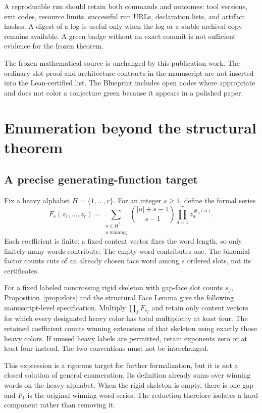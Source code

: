 \documentclass[11pt,reqno]{amsart}
\theoremstyle{definition}
\newcommand{\card}[1]{\lvert #1\rvert}
\begin{document}
A reproducible run should retain both commands and outcomes: tool versions,
exit codes, resource limits, successful run URLs, declaration lists, and
artifact hashes. A digest of a log is useful only when the log or a stable
archival copy remains available. A green badge without an exact commit is
not sufficient evidence for the frozen theorem.

The frozen mathematical source is unchanged by this publication work.
The ordinary slot proof and architecture contracts in the manuscript are not
inserted into the Lean-certified list. The Blueprint includes open nodes
where appropriate and does not color a conjecture green because it appears
in a polished paper.

\section{Enumeration beyond the structural theorem}\label{sec:enumeration}
\subsection{A precise generating-function target}
Fix a heavy alphabet $H=\{1,\ldots,r\}$. For an integer $s\geq1$, define the
formal series
\[
 F_s(z_1,\ldots,z_r)=
 \sum_{\substack{u\in H^*\\u\text{ winning}}}
 \binom{\card{u}+s-1}{s-1}
 \prod_{a=1}^r z_a^{\,\#_a(u)}.
\]
Each coefficient is finite: a fixed content vector fixes the word length,
so only finitely many words contribute. The empty word contributes one.
The binomial factor counts cuts of an already chosen face word among $s$
ordered slots, not its certificates.

For a fixed labeled noncrossing rigid skeleton with gap-face slot counts
$s_f$, Proposition~\ref{prop:slots} and the structural Face Lemma give the
following manuscript-level specification. Multiply $\prod_f F_{s_f}$ and
retain only content vectors for which every designated heavy color has
total multiplicity at least four. The retained coefficient counts winning
extensions of that skeleton using exactly those heavy colors. If unused
heavy labels are permitted, retain exponents zero or at least four instead.
The two conventions must not be interchanged.

This expression is a rigorous target for further formalization, but it is not
a closed solution of general enumeration. Its definition already sums over
winning words on the heavy alphabet. When the rigid skeleton is empty,
there is one gap and $F_1$ is the original winning-word series. The reduction
therefore isolates a hard component rather than removing it.
\end{document}
